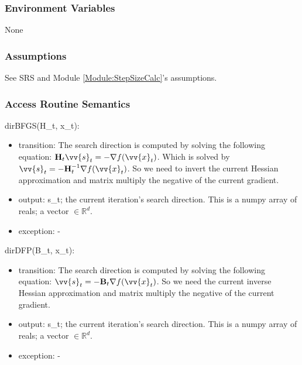\documentclass[12pt, titlepage]{article}
\begin{document}
\subsubsection{Environment Variables}
None
\subsubsection{Assumptions}
See SRS and Module \ref{Module:StepSizeCalc}'s assumptions.

\subsubsection{Access Routine Semantics}

\noindent dirBFGS(H\_t, x\_t):
\begin{itemize}
\item transition: The search direction is computed by solving the following equation: $\mathbf{H}_t \vv{s}_{t} = -\nabla f(\vv{x}_{t})$. Which is solved by $\vv{s}_{t} = -\mathbf{H}^{-1}_{t}\nabla f(\vv{x}_{t})$. So we need to invert the current Hessian approximation and matrix multiply the negative of the current gradient.
\item output: s\_t; the current iteration's search direction. This is a numpy array of reals; a vector $\in \mathbb{R}^d$. 
\item exception: -
\end{itemize}

\noindent dirDFP(B\_t, x\_t):
\begin{itemize}
\item transition: The search direction is computed by solving the following equation: $\vv{s}_{t} = -\mathbf{B}_t \nabla f(\vv{x}_{t})$. So we need the current inverse Hessian approximation and matrix multiply the negative of the current gradient.
\item output: s\_t; the current iteration's search direction. This is a numpy array of reals; a vector $\in \mathbb{R}^d$. 
\item exception: - 
\end{itemize}
\end{document}
